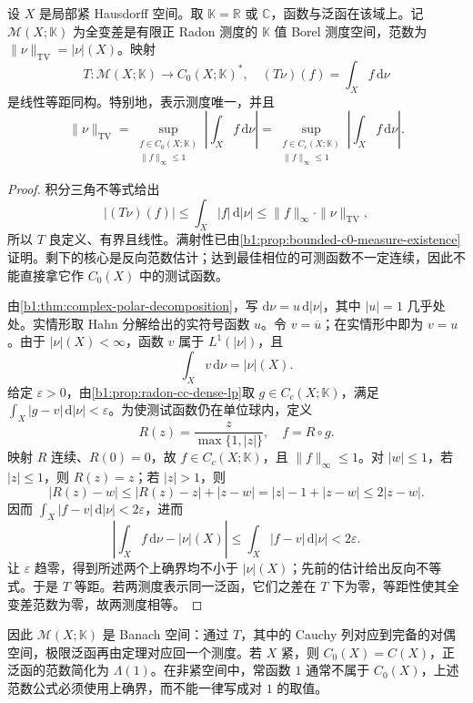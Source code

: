 \begin{theorem}\label{b1:thm:riesz-markov-c0}
设 \(X\) 是局部紧 Hausdorff 空间。取 \(\mathbb K=\mathbb R\) 或 \(\mathbb C\)，函数与泛函在该域上。记 \(\mathcal M(X;\mathbb K)\) 为全变差是有限正 Radon 测度的 \(\mathbb K\) 值 Borel 测度空间，范数为 \(\|\nu\|_{\mathrm{TV}}=|\nu|(X)\)。映射
\[
 T:\mathcal M(X;\mathbb K)\longrightarrow C_0(X;\mathbb K)^*,
 \quad (T\nu)(f)=\int_X f\,\mathrm d\nu
\]
是线性等距同构。特别地，表示测度唯一，并且
\[
 \|\nu\|_{\mathrm{TV}}
 =\sup_{\substack{f\in C_0(X;\mathbb K)\\ \|f\|_\infty\leq1}}
       \left|\int_Xf\,\mathrm d\nu\right|
 =\sup_{\substack{f\in C_c(X;\mathbb K)\\ \|f\|_\infty\leq1}}
       \left|\int_Xf\,\mathrm d\nu\right|.
\]
\end{theorem}
\begin{proof}
积分三角不等式给出
\[
 |(T\nu)(f)|\leq\int_X|f|\,\mathrm d|\nu|
 \leq\|f\|_\infty\cdot\|\nu\|_{\mathrm{TV}},
\]
所以 \(T\) 良定义、有界且线性。满射性已由\cref{b1:prop:bounded-c0-measure-existence}证明。剩下的核心是反向范数估计；达到最佳相位的可测函数不一定连续，因此不能直接拿它作 \(C_0(X)\) 中的测试函数。

由\cref{b1:thm:complex-polar-decomposition}，写 \(\mathrm d\nu=u\,\mathrm d|\nu|\)，其中 \(|u|=1\) 几乎处处。实情形取 Hahn 分解给出的实符号函数 \(u\)。令 \(v=\overline u\)；在实情形中即为 \(v=u\)。由于 \(|\nu|(X)<\infty\)，函数 \(v\) 属于 \(L^1(|\nu|)\)，且
\[
 \int_Xv\,\mathrm d\nu=|\nu|(X).
\]
给定 \(\varepsilon>0\)，由\cref{b1:prop:radon-cc-dense-lp}取 \(g\in C_c(X;\mathbb K)\)，满足 \(\int_X|g-v|\,\mathrm d|\nu|<\varepsilon\)。为使测试函数仍在单位球内，定义
\[
 R(z)=\frac{z}{\max\{1,|z|\}},\quad f=R\circ g.
\]
映射 \(R\) 连续、\(R(0)=0\)，故 \(f\in C_c(X;\mathbb K)\)，且 \(\|f\|_\infty\leq1\)。对 \(|w|\leq1\)，若 \(|z|\leq1\)，则 \(R(z)=z\)；若 \(|z|>1\)，则
\[
 |R(z)-w|
 \leq |R(z)-z|+|z-w|
 =|z|-1+|z-w|\leq2|z-w|.
\]
因而 \(\int_X|f-v|\,\mathrm d|\nu|<2\varepsilon\)，进而
\[
 \left|\int_Xf\,\mathrm d\nu-|\nu|(X)\right|
 \leq\int_X|f-v|\,\mathrm d|\nu|<2\varepsilon.
\]
让 \(\varepsilon\) 趋零，得到所述两个上确界均不小于 \(|\nu|(X)\)；先前的估计给出反向不等式。于是 \(T\) 等距。若两测度表示同一泛函，它们之差在 \(T\) 下为零，等距性使其全变差范数为零，故两测度相等。
\end{proof}

因此 \(\mathcal M(X;\mathbb K)\) 是 Banach 空间：通过 \(T\)，其中的 Cauchy 列对应到完备的对偶空间，极限泛函再由定理对应回一个测度。若 \(X\) 紧，则 \(C_0(X)=C(X)\)，正泛函的范数简化为 \(\Lambda(1)\)。在非紧空间中，常函数 \(1\) 通常不属于 \(C_0(X)\)，上述范数公式必须使用上确界，而不能一律写成对 \(1\) 的取值。

